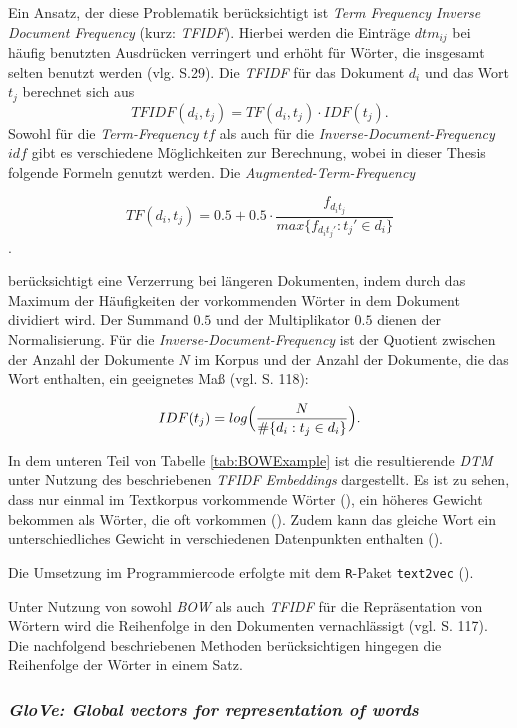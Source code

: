 \documentclass[a4paper,11pt]{article}
\begin{document}
Ein Ansatz, der diese Problematik berücksichtigt ist \textit{Term Frequency Inverse Document Frequency} (kurz: \textit{TFIDF}). Hierbei werden die Einträge $dtm_{ij}$ bei häufig benutzten Ausdrücken verringert und erhöht für Wörter, die insgesamt selten benutzt werden (vlg. \cite{textMiningR} S.29). Die \textit{TFIDF} für das Dokument $d_i$ und das Wort $t_j$ berechnet sich aus 
\[TFIDF(d_i, t_j) = TF(d_i,t_j) \cdot IDF(t_j) . \]
Sowohl für die \textit{Term-Frequency} $tf$ als auch für die \textit{Inverse-Document-Frequency} $idf$ gibt es verschiedene Möglichkeiten zur Berechnung, wobei in dieser Thesis folgende Formeln genutzt werden.
Die \textit{Augmented-Term-Frequency}

\[TF(d_i,t_j) = 0.5 +  0.5 \cdot \frac{f_{d_i t_j}}{max \{ f_{d_i t_j'}: t_j' \in d_i \}} \].

berücksichtigt eine Verzerrung bei längeren Dokumenten, indem durch das Maximum der Häufigkeiten der vorkommenden Wörter in dem Dokument dividiert wird. Der Summand $0.5$ und der Multiplikator $0.5$ dienen der Normalisierung. Für die \textit{Inverse-Document-Frequency} ist der Quotient zwischen der Anzahl der Dokumente $N$ im Korpus und der Anzahl der Dokumente, die das Wort enthalten, ein geeignetes Maß (vgl. \cite{deepEssentials} S. 118):

\[IDF(t_j) = log \Bigl( \frac{N}{\# \{d_i: t_j \in d_i \}} \Bigr) .\]

In dem unteren Teil von Tabelle \ref{tab:BOWExample} ist die resultierende \textit{DTM} unter Nutzung des beschriebenen \textit{TFIDF Embeddings} dargestellt. Es ist zu sehen, dass nur einmal im Textkorpus vorkommende Wörter (), ein höheres Gewicht bekommen als Wörter, die oft vorkommen (). Zudem kann das gleiche Wort ein unterschiedliches Gewicht in verschiedenen Datenpunkten enthalten ().

Die Umsetzung im Programmiercode erfolgte mit dem \texttt{R}-Paket \texttt{text2vec} (\cite{text2vec}).

Unter Nutzung von sowohl \textit{BOW} als auch \textit{TFIDF} für die Repräsentation von Wörtern wird die Reihenfolge in den Dokumenten vernachlässigt (vgl. \cite{deepEssentials} S. 117). 
Die nachfolgend beschriebenen Methoden berücksichtigen hingegen die Reihenfolge der Wörter in einem Satz.


\subsubsection{\textit{GloVe: Global vectors for representation of words}} \label{Kap:Glove}
\end{document}
